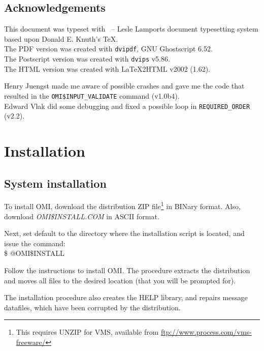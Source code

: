 \documentclass[a4paper]{book}
\newcommand{\vs}{\vspace{3mm}}
\renewcommand{\indent}{\hspace*{5mm}}
\begin{document}
\section*{Acknowledgements}

This document was typeset with \LaTeXe\ -- Lesle Lamports document typesetting system
based upon Donald E. Knuth's \TeX.\\
The PDF version was created with \texttt{dvipdf}, GNU Ghostscript 6.52.\\
The Postscript version was created with \texttt{dvips} v5.86. \\
The HTML version was created with LaTeX2HTML v2002 (1.62).

\vs

Henry Juengst made me aware of possible crashes and gave me the code that
resulted in the \texttt{OMI\$INPUT\_VALIDATE} command (v1.0b4). \\
Edward Vlak did some debugging and fixed a possible loop in \texttt{REQUIRED\_ORDER} (v2.2).

\chapter{Installation}
\label{sec:installationrmed}

\section{System installation}
\label{subsec:system}

To install OMI, download the distribution ZIP file\footnote{ This requires UNZIP for VMS, available from
\url{ftp://www.process.com/vms-freeware/}} in BINary format.
Also, download \textsl{OMI{\$}INSTALL.COM} in ASCII format.
 
Next, set default to the directory where the installation
script is located, and issue the command: \\
\indent \textsf{{\$} @OMI{\$}INSTALL}
 

\vs

Follow the instructions to install OMI.
The procedure extracts the distribution and moves all
files to the desired location (that you will be prompted for).
 
The installation procedure also creates the HELP library,
and repairs message datafiles, which have been corrupted
by the distribution.
\end{document}
